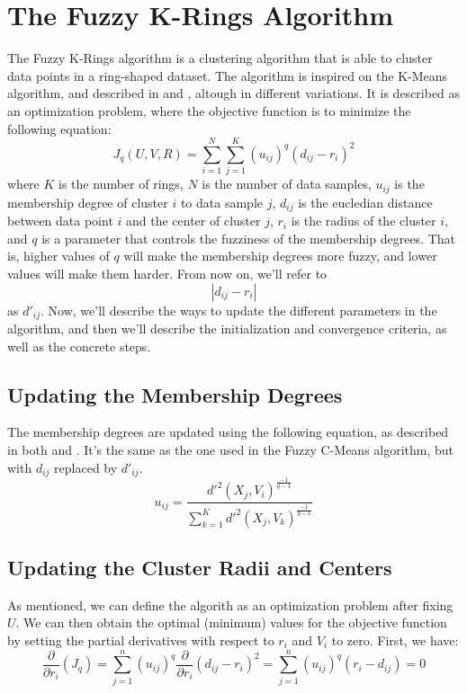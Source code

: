 \documentclass[conference]{IEEEtran}
\begin{document}
\section{The Fuzzy K-Rings Algorithm}
The Fuzzy K-Rings algorithm is a clustering algorithm that is able to cluster data points in a ring-shaped dataset.
The algorithm is inspired on the K-Means algorithm, and described in \cite{DAVE1992713} and \cite{308484}, altough in different variations.
It is described as an optimization problem, where the objective function is to minimize the following equation:
\begin{equation}\label{eq:objective}
J_q(U, V, R) = \sum_{i=1}^{N} \sum_{j=1}^{K} (u_{ij})^q (d_{ij} - r_i)^2
\end{equation}
where $K$ is the number of rings, $N$ is the number of data samples, $u_{ij}$ is the membership degree of cluster $i$ to data sample $j$, $d_{ij}$ is the eucledian distance between data point $i$ and the center of cluster $j$, $r_i$ is the radius of the cluster $i$, and $q$ is a parameter that controls the fuzziness of the membership degrees.
That is, higher values of $q$ will make the membership degrees more fuzzy, and lower values will make them harder.
From now on, we'll refer to $$|d_{ij} - r_i|$$ as $d'_{ij}$.
Now, we'll describe the ways to update the different parameters in the algorithm, and then we'll describe the initialization and convergence criteria, as well as the concrete steps.

\subsection{Updating the Membership Degrees}
The membership degrees are updated using the following equation, as described in both \cite{DAVE1992713} and \cite{308484}. It's the same as the one used in the Fuzzy C-Means algorithm, but with $d_{ij}$ replaced by $d'_{ij}$.
\begin{equation}
u_{ij} = \frac{d'^2(X_j, V_i)^{\frac{-1}{q-1}}}{\sum_{k=1}^{K} d'^2(X_j, V_k)^{\frac{-1}{q-1}}}
\end{equation}

\subsection{Updating the Cluster Radii and Centers}
As mentioned, we can define the algorith as an optimization problem after fixing $U$. We can then obtain the optimal (minimum) values for the objective function
by setting the partial derivatives with respect to $r_i$ and $V_i$ to zero.
First, we have:
\begin{equation}\label{eq:d_dr}
\frac{\partial}{\partial r_i}(J_q) = \sum_{j=1}^{n} (u_{ij})^q\frac{\partial}{\partial r_i} (d_{ij} - r_i)^2 = \sum_{j=1}^{n} (u_{ij})^q (r_i - d_{ij}) = 0
\end{equation}
\end{document}
